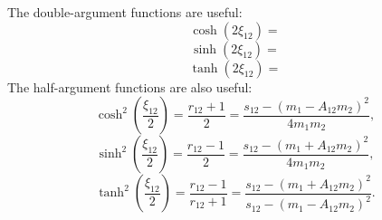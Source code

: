 The double-argument functions are useful:
\begin{equation}
	\operatorname{cosh}{\left( 2\xi_{12} \right)} = 
\end{equation}
\begin{equation}
	\operatorname{sinh}{\left( 2\xi_{12} \right)} = 
\end{equation}
\begin{equation}
	\operatorname{tanh}{\left( 2\xi_{12} \right)} = 
\end{equation}
The half-argument functions are also useful:
\begin{equation}
	\operatorname{cosh}^{2}{\left( \frac{\xi_{12}}{2} \right)} = \frac{r_{12} + 1}{2} = \frac{s_{12} - \left( m_{1} - A_{12} m_{2} \right)^{2}}{4 m_{1} m_{2}},
\end{equation}
\begin{equation}
	\operatorname{sinh}^{2}{\left( \frac{\xi_{12}}{2} \right)} = \frac{r_{12} - 1}{2} = \frac{s_{12} - \left( m_{1} + A_{12} m_{2} \right)^{2}}{4 m_{1} m_{2}},
\end{equation}
\begin{equation}
	\operatorname{tanh}^{2}{\left( \frac{\xi_{12}}{2} \right)} = \frac{r_{12} - 1}{r_{12} + 1} = \frac{s_{12} - \left( m_{1} + A_{12} m_{2} \right)^{2}}{s_{12} - \left( m_{1} - A_{12} m_{2} \right)^{2}}.
\end{equation}